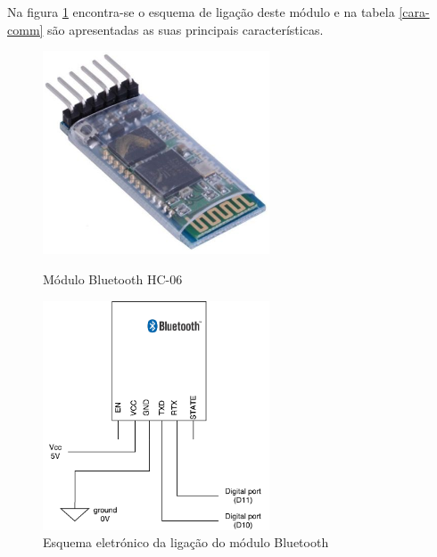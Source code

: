 Na figura \ref{comimageesquema} encontra-se o esquema de ligação deste módulo e na tabela \ref{cara-comm} são apresentadas as suas principais características.

\newpage

\begin{figure}[h]
	\centering
	\begin{minipage}[b]{0.49\textwidth}
		\centering
		\includegraphics[width=0.6\textwidth]{img/hardware/bluetooth_zs-040.png}
		\caption{Módulo Bluetooth HC-06}
		\label{comimage}
	\end{minipage}
	\hfill
	\begin{minipage}[b]{0.49\textwidth}
		\centering
		\includegraphics[width=0.6\textwidth]{img/comm-blue/electronic-sensors.pdf}
		\caption{Esquema eletrónico da ligação do módulo Bluetooth}
		\label{comimageesquema}
	\end{minipage}
\end{figure}

